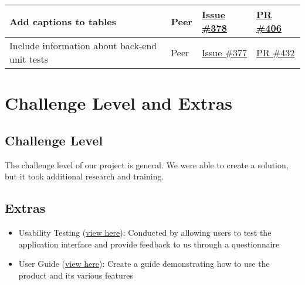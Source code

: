 \documentclass{article}
\begin{document}
\begin{longtable}{|p{5cm}|p{1.5cm}|p{2cm}|p{5cm}|}
Add captions to tables & Peer & \href{https://github.com/OKKM-insights/OKKM.insights/issues/378}{Issue \#378} & \href{https://github.com/OKKM-insights/OKKM.insights/pull/406}{PR \#406} \\ \hline
Include information about back-end unit tests & Peer & \href{https://github.com/OKKM-insights/OKKM.insights/issues/377}{Issue \#377} & \href{https://github.com/OKKM-insights/OKKM.insights/pull/432}{PR \#432} \\ \hline
\end{longtable}
\section{Challenge Level and Extras}

\subsection{Challenge Level}
The challenge level of our project is general. We were able to create a solution, but it took additional research and training.

\subsection{Extras}
\begin{itemize}
  \item Usability Testing (\href{https://github.com/OKKM-insights/OKKM.insights/blob/main/docs/Extras/UsabilityReport/UsabilityReport.pdf}{view here}): Conducted by allowing users to test the application interface and provide feedback to us through a questionnaire
  \item User Guide (\href{https://github.com/OKKM-insights/OKKM.insights/blob/main/docs/UserGuide/OrbitWatch%20User%20Guide.pdf}{view here}): Create a guide demonstrating how to use the product and its various features
\end{itemize}
\end{document}
